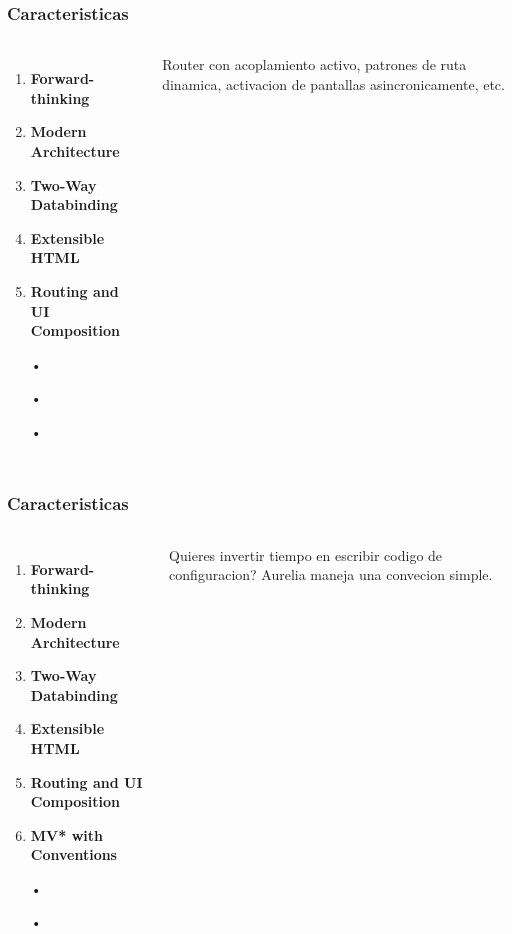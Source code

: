 \documentclass{beamer}
\begin{document}
\begin{frame}
\frametitle{Caracteristicas}
\begin{columns}[c] %

\begin{enumerate}
\item \textbf{Forward-thinking}
\item \textbf{Modern Architecture}
\item \textbf{Two-Way Databinding}
\item \textbf{Extensible HTML}
\item \textbf{Routing and UI Composition}
\item[•]	
\item[•]	
\item[•]	
\end{enumerate}

Router con acoplamiento activo, patrones de ruta dinamica, activacion de pantallas asincronicamente, etc.
\end{columns}
\end{frame}

\begin{frame}
\frametitle{Caracteristicas}
\begin{columns}[c] %

\begin{enumerate}
\item \textbf{Forward-thinking}
\item \textbf{Modern Architecture}
\item \textbf{Two-Way Databinding}
\item \textbf{Extensible HTML}
\item \textbf{Routing and UI Composition}
\item \textbf{MV* with Conventions}
\item[•]	
\item[•]	
\end{enumerate}

Quieres invertir tiempo en escribir codigo de configuracion? Aurelia maneja una convecion simple.
\end{columns}
\end{frame}
\end{document}
